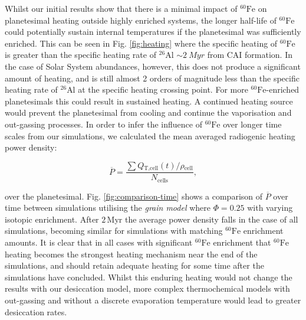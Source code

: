 \documentclass[fleqn,usenatbib]{mnras}
\newcommand{\rms}[1]{\ensuremath{_{\text{#1}}}}
\newcommand{\atom}[2]{$^{#2}\text{#1}$}
\newcommand{\al}{\atom{Al}{26}}
\newcommand{\fe}{\atom{Fe}{60}}
\begin{document}
Whilst our initial results show that there is a minimal impact of \fe{} on planetesimal heating outside highly enriched systems, the longer half-life of \fe{} could potentially sustain internal temperatures if the planetesimal was sufficiently enriched.
This can be seen in Fig. \ref{fig:heating} where the specific heating of \fe{} is greater than the specific heating rate of \al{} $\sim\SI{2}{Myr}$ from CAI formation.
In the case of Solar System abundances, however, this does not produce a significant amount of heating, and is still almost 2 orders of magnitude less than the specific heating rate of \al{} at the specific heating crossing point.
For more \fe{}-enriched planetesimals this could result in sustained heating.
A continued heating source would prevent the planetesimal from cooling and continue the vaporisation and out-gassing processes.
In order to infer the influence of \fe{} over longer time scales from our simulations, we calculated the mean averaged radiogenic heating power density:

\begin{equation}
    \overline{P} = \frac{\sum{Q\rms{T,cell}(t) / \rho\rms{cell}}}{N\rms{cells}} , 
\end{equation}

\noindent
over the planetesimal.
Fig. \ref{fig:comparison-time} shows a comparison of $\overline{P}$ over time between simulations utilising the \emph{grain model} where $\Phi = 0.25$ with varying isotopic enrichment.
After $2\,$Myr the average power density falls in the case of all simulations, becoming similar for simulations with matching \fe{} enrichment amounts.
It is clear that in all cases with significant \fe{} enrichment that \fe{} heating becomes the strongest heating mechanism near the end of the simulations, and should retain adequate heating for some time after the simulations have concluded.
Whilst this enduring heating would not change the results with our desiccation model, more complex thermochemical models with out-gassing and without a discrete evaporation temperature would lead to greater desiccation rates. 
\end{document}
